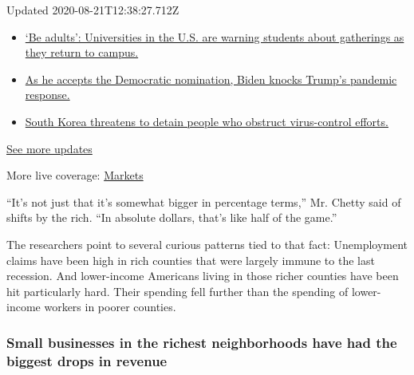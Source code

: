 Updated 2020-08-21T12:38:27.712Z

\begin{itemize}
\tightlist
\item
  \href{https://www.nytimes3xbfgragh.onion/2020/08/21/world/covid-19-coronavirus.html?action=click\&pgtype=Article\&state=default\&region=MAIN_CONTENT_1\&context=storylines_live_updates\#link-6a60a19d}{`Be
  adults': Universities in the U.S. are warning students about
  gatherings as they return to campus.}
\item
  \href{https://www.nytimes3xbfgragh.onion/2020/08/21/world/covid-19-coronavirus.html?action=click\&pgtype=Article\&state=default\&region=MAIN_CONTENT_1\&context=storylines_live_updates\#link-324af071}{As
  he accepts the Democratic nomination, Biden knocks Trump's pandemic
  response.}
\item
  \href{https://www.nytimes3xbfgragh.onion/2020/08/21/world/covid-19-coronavirus.html?action=click\&pgtype=Article\&state=default\&region=MAIN_CONTENT_1\&context=storylines_live_updates\#link-191d44be}{South
  Korea threatens to detain people who obstruct virus-control efforts.}
\end{itemize}

\href{https://www.nytimes3xbfgragh.onion/2020/08/21/world/covid-19-coronavirus.html?action=click\&pgtype=Article\&state=default\&region=MAIN_CONTENT_1\&context=storylines_live_updates}{See
more updates}

More live coverage:
\href{https://www.nytimes3xbfgragh.onion/live/2020/08/21/business/stock-market-today-coronavirus?action=click\&pgtype=Article\&state=default\&region=MAIN_CONTENT_1\&context=storylines_live_updates}{Markets}

``It's not just that it's somewhat bigger in percentage terms,'' Mr.
Chetty said of shifts by the rich. ``In absolute dollars, that's like
half of the game.''

The researchers point to several curious patterns tied to that fact:
Unemployment claims have been high in rich counties that were largely
immune to the last recession. And lower-income Americans living in those
richer counties have been hit particularly hard. Their spending fell
further than the spending of lower-income workers in poorer counties.

\hypertarget{small-businesses-in-the-richest-neighborhoods-have-had-the-biggest-drops-in-revenue}{%
\subsubsection{Small businesses in the richest neighborhoods have had
the biggest drops in
revenue}\label{small-businesses-in-the-richest-neighborhoods-have-had-the-biggest-drops-in-revenue}}

